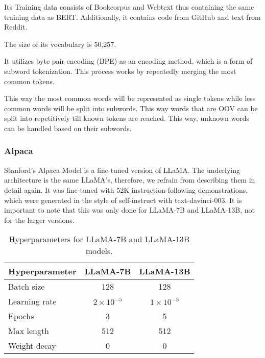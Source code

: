 Its Training data consists of Bookcorpus and Webtext thus containing the same training data as BERT. Additionally, it contains code from GitHub and text from Reddit.

The size of its vocabulary is 50,257\cite{Radford2019LanguageMA}.


It utilizes byte pair encoding (BPE) as an encoding method, which is a form of subword tokenization. This process works by repeatedly merging the most common tokens. 

This way the most common words will be represented as single tokens while less common words will be split into subwords. This way words that are OOV can be split into repetitively till known tokens are reached. This way, unknown words can be handled based on their subwords.



 



\subsubsection{Alpaca} 

Stanford's Alpaca Model is a fine-tuned version of LLaMA. The underlying architecture is the same LLaMA's, therefore, we refrain from describing them in detail again. It was fine-tuned with 52K instruction-following demonstrations, which were generated in the style of self-instruct \cite{wang2023selfinstruct} with text-davinci-003. It is important to note that this was only done for LLaMA-7B and LLaMA-13B, not for the larger versions.




\begin{table}[ht]
\centering
\begin{tabular}{|l|c|c|}
\hline
\textbf{Hyperparameter} & \textbf{LLaMA-7B} & \textbf{LLaMA-13B} \\
\hline
Batch size & 128 & 128 \\
Learning rate & $2 \times 10^{-5}$ & $1 \times 10^{-5}$ \\
Epochs & 3 & 5 \\
Max length & 512 & 512 \\
Weight decay & 0 & 0 \\
\hline
\end{tabular}
\caption{Hyperparameters for LLaMA-7B and LLaMA-13B models.\cite{alpaca}}
\label{tab:hyperparameters}
\end{table}





